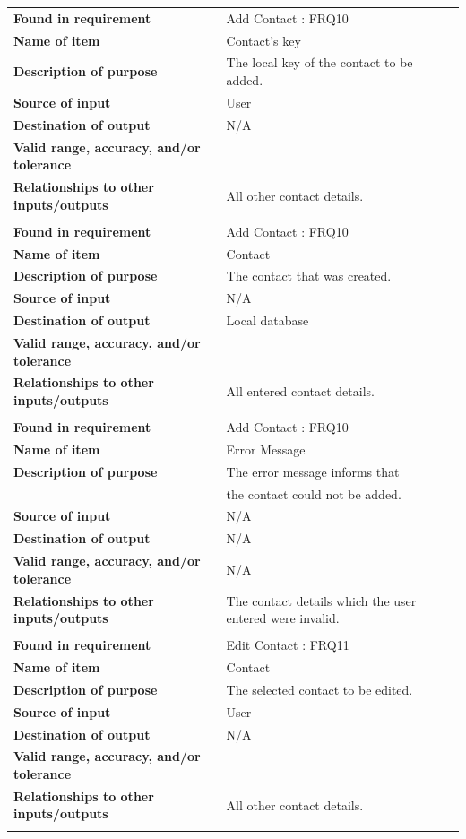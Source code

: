 \newpage
\begin{tabular}{ll}
\textbf{Found in requirement}&Add Contact : FRQ10\\
\textbf{Name of item}&Contact's key\\
\textbf{Description of purpose}&The local key of the contact to be added.\\
\textbf{Source of input}&User\\
\textbf{Destination of output}&N/A\\
\textbf{Valid range, accuracy, and/or tolerance}&\\
\textbf{Relationships to other inputs/outputs}&All other contact details.\\
&\\
\textbf{Found in requirement}&Add Contact : FRQ10\\
\textbf{Name of item}&Contact\\
\textbf{Description of purpose}&The contact that was created.\\
\textbf{Source of input}&N/A\\
\textbf{Destination of output}&Local database\\
\textbf{Valid range, accuracy, and/or tolerance}&\\
\textbf{Relationships to other inputs/outputs}&All entered contact details.\\
&\\
\textbf{Found in requirement}&Add Contact : FRQ10\\
\textbf{Name of item}&Error Message\\
\textbf{Description of purpose}&The error message informs that \\&the contact could not be added.\\
\textbf{Source of input}&N/A\\
\textbf{Destination of output}&N/A\\
\textbf{Valid range, accuracy, and/or tolerance}&N/A\\
\textbf{Relationships to other inputs/outputs}&The contact details which the user entered were invalid.\\
&\\
\textbf{Found in requirement}&Edit Contact : FRQ11\\
\textbf{Name of item}&Contact\\
\textbf{Description of purpose}&The selected contact to be edited.\\
\textbf{Source of input}&User\\
\textbf{Destination of output}&N/A\\
\textbf{Valid range, accuracy, and/or tolerance}&\\
\textbf{Relationships to other inputs/outputs}&All other contact details.\\
&\\
\end{tabular}
